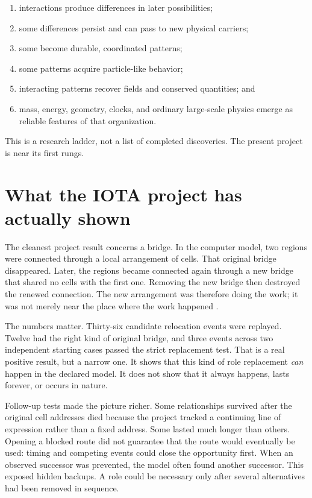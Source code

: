 \documentclass[11pt]{article}
\begin{document}
\begin{enumerate}
  \item interactions produce differences in later possibilities;
  \item some differences persist and can pass to new physical carriers;
  \item some become durable, coordinated patterns;
  \item some patterns acquire particle-like behavior;
  \item interacting patterns recover fields and conserved quantities; and
  \item mass, energy, geometry, clocks, and ordinary large-scale physics emerge
  as reliable features of that organization.
\end{enumerate}

This is a research ladder, not a list of completed discoveries. The present
project is near its first rungs.

\section*{What the IOTA project has actually shown}

The cleanest project result concerns a bridge. In the computer model, two
regions were connected through a local arrangement of cells. That original
bridge disappeared. Later, the regions became connected again through a new
bridge that shared no cells with the first one. Removing the new bridge then
destroyed the renewed connection. The new arrangement was therefore doing the
work; it was not merely near the place where the work happened
\citep{Clark2026IotaConstraint}.

The numbers matter. Thirty-six candidate relocation events were replayed.
Twelve had the right kind of original bridge, and three events across two
independent starting cases passed the strict replacement test. That is a real
positive result, but a narrow one. It shows that this kind of role replacement
\emph{can} happen in the declared model. It does not show that it always
happens, lasts forever, or occurs in nature.

Follow-up tests made the picture richer. Some relationships survived after the
original cell addresses died because the project tracked a continuing line of
expression rather than a fixed address. Some lasted much longer than others.
Opening a blocked route did not guarantee that the route would eventually be
used: timing and competing events could close the opportunity first. When an
observed successor was prevented, the model often found another successor.
This exposed hidden backups. A role could be necessary only after several
alternatives had been removed in sequence.
\end{document}
